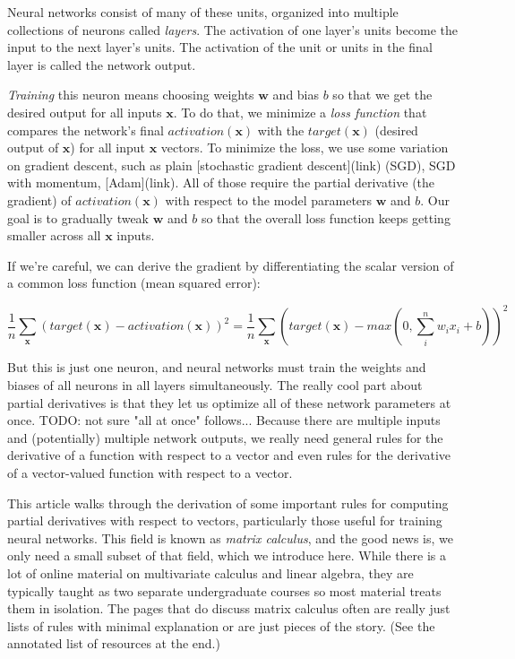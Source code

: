 \documentclass[11pt]{article}
\begin{document}
Neural networks consist of many of these units, organized into multiple collections of neurons called {\em layers}. The activation of one layer's units become the input to the next layer's units. The activation of the unit or units in the final layer is called the network output.

{\em Training} this neuron means choosing weights $\mathbf{w}$ and bias $b$ so that we get the desired output for all inputs $\mathbf{x}$.  To do that, we minimize a {\em loss function} that compares the network's final $activation({\mathbf{x}})$ with the $target(\mathbf{x})$ (desired output of $\mathbf{x}$) for all input $\mathbf{x}$ vectors. To minimize the loss, we use some variation on gradient descent, such as plain [stochastic gradient descent](link) (SGD), SGD with momentum, [Adam](link).   All of those require the partial derivative (the gradient) of $activation({\mathbf{x}})$ with respect to the model parameters $\mathbf{w}$ and $b$. Our goal is to gradually tweak $\mathbf{w}$ and $b$ so that the overall loss function keeps getting smaller across all $\mathbf{x}$ inputs.

If we're careful, we can derive the gradient by differentiating the scalar version of a common loss function (mean squared error):

\[\frac{1}{n} \sum_{\mathbf{x}} (target(\mathbf{x}) - activation(\mathbf{x}))^2 = \frac{1}{n} \sum_{\mathbf{x}} (target(\mathbf{x}) - max(0, \sum_i^n w_i x_i + b))^2\]

But this is just one neuron, and neural networks must train the weights and biases of all neurons in all layers simultaneously.  The really cool part about partial derivatives is that they let us optimize all of these network parameters at once. TODO: not sure "all at once" follows... Because there are multiple inputs and (potentially) multiple network outputs, we really need general rules for the derivative of a function with respect to a vector and even rules for the derivative of a vector-valued function with respect to a vector.

This article walks through the derivation of some important rules for computing partial derivatives with respect to vectors, particularly those useful for training neural networks. This field is known as {\em matrix calculus}, and the good news is, we only need a small subset of that field, which we introduce here.  While there is a lot of online material on multivariate calculus and linear algebra, they are typically taught as two separate undergraduate courses so most material treats them in isolation.  The pages that do discuss matrix calculus often are really just lists of rules with minimal explanation or are just pieces of the story. (See the annotated list of resources at the end.)
\end{document}
